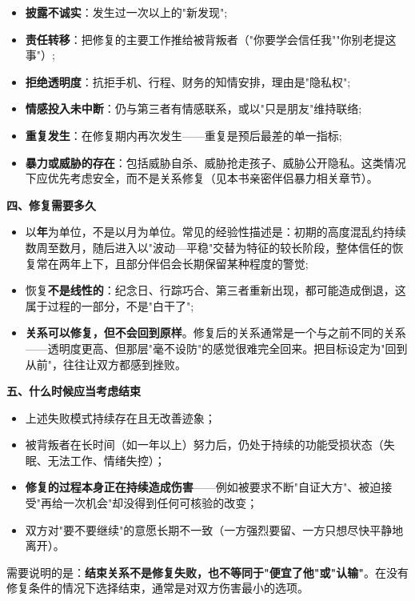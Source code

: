 \begin{itemize}
\item \textbf{披露不诚实}：发生过一次以上的"新发现";
\item \textbf{责任转移}：把修复的主要工作推给被背叛者（"你要学会信任我""你别老提这事"）;
\item \textbf{拒绝透明度}：抗拒手机、行程、财务的知情安排，理由是"隐私权";
\item \textbf{情感投入未中断}：仍与第三者有情感联系，或以"只是朋友"维持联络;
\item \textbf{重复发生}：在修复期内再次发生——重复是预后最差的单一指标;
\item \textbf{暴力或威胁的存在}：包括威胁自杀、威胁抢走孩子、威胁公开隐私。这类情况下应优先考虑安全，而不是关系修复（见本书亲密伴侣暴力相关章节）。
\end{itemize}

\textbf{四、修复需要多久}

\begin{itemize}
\item 以\textbf{年}为单位，不是以月为单位。常见的经验性描述是：初期的高度混乱约持续数周至数月，随后进入以"波动—平稳"交替为特征的较长阶段，整体信任的恢复常在两年上下，且部分伴侣会长期保留某种程度的警觉;
\item 恢复\textbf{不是线性的}：纪念日、行踪巧合、第三者重新出现，都可能造成倒退，这属于过程的一部分，不是"白干了";
\item \textbf{关系可以修复，但不会回到原样}。修复后的关系通常是一个与之前不同的关系——透明度更高、但那层"毫不设防"的感觉很难完全回来。把目标设定为"回到从前"，往往让双方都感到挫败。
\end{itemize}

\textbf{五、什么时候应当考虑结束}

\begin{itemize}
\item 上述失败模式持续存在且无改善迹象；
\item 被背叛者在长时间（如一年以上）努力后，仍处于持续的功能受损状态（失眠、无法工作、情绪失控）；
\item \textbf{修复的过程本身正在持续造成伤害}——例如被要求不断"自证大方"、被迫接受"再给一次机会"却没得到任何可核验的改变；
\item 双方对"要不要继续"的意愿长期不一致（一方强烈要留、一方只想尽快平静地离开）。
\end{itemize}

需要说明的是：\textbf{结束关系不是修复失败，也不等同于"便宜了他"或"认输"}。在没有修复条件的情况下选择结束，通常是对双方伤害最小的选项。

